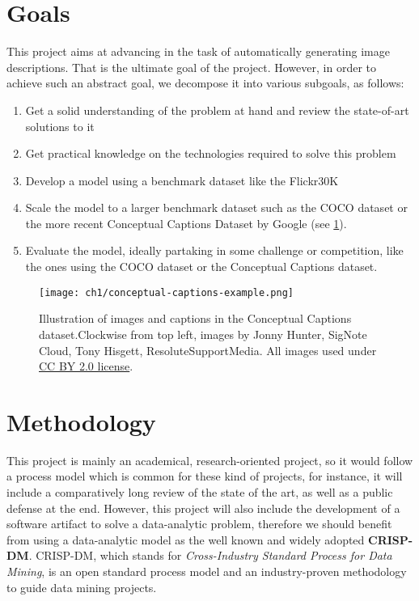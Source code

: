 \section{Goals}

This project aims at advancing in the task of automatically generating image descriptions. That is the ultimate goal of the project. However, in order to achieve such an abstract goal, we decompose it into various subgoals, as follows:

\begin{enumerate}
\item Get a solid understanding of the problem at hand and review the state-of-art solutions to it
\item Get practical knowledge on the technologies required to solve this problem
\item Develop a model using a benchmark dataset like the Flickr30K
\item Scale the model to a larger benchmark dataset such as the COCO\cite{Lin2014} dataset or the more recent Conceptual Captions Dataset by Google \cite{Sharma2018}  (see \cref{fig:conceptual-captions}).
\item Evaluate the model, ideally partaking in some challenge or competition, like the ones using the COCO dataset or the Conceptual Captions dataset.
\end{enumerate}

\begin{figure}[hpt]
	\centering
	\texttt{[image: ch1/conceptual-captions-example.png]}
	\caption{Illustration of images and captions in the Conceptual Captions dataset.Clockwise from top left, images by Jonny Hunter, SigNote Cloud, Tony Hisgett, ResoluteSupportMedia. All images used under \href{https://creativecommons.org/licenses/by/2.0/}{CC BY 2.0 license}.}
	\label{fig:conceptual-captions}
\end{figure}

\section{Methodology}

This project is mainly an academical, research-oriented project, so it would follow a process model which is common for these kind of projects, for instance, it will include a comparatively long review of the state of the art, as well as a public defense at the end. However, this project will also include the development of a software artifact to solve a data-analytic problem, therefore we should benefit from using a data-analytic model as the well known and widely adopted \textbf{CRISP-DM}. CRISP-DM, which stands for \textit{Cross-Industry Standard Process for Data Mining}, is an open standard process model and an industry-proven methodology to guide data mining projects.

